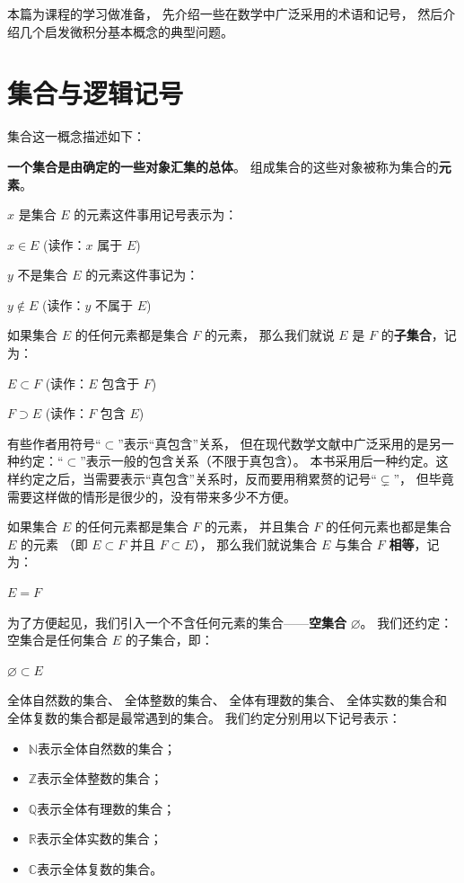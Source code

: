 \documentclass[12pt,a4paper,oneside,utf8]{ctexbook}
\begin{document}
\else%
\fi

本篇为课程的学习做准备，
先介绍一些在数学中广泛采用的术语和记号，
然后介绍几个启发微积分基本概念的典型问题。

\section{集合与逻辑记号}

集合这一概念描述如下：

\textbf{一个集合是由确定的一些对象汇集的总体}。
组成集合的这些对象被称为集合的\textbf{元素}。

$x$ 是集合 $E$ 的元素这件事用记号表示为：
\begin{center}
$x \in E$ \quad (读作：$x$ 属于 $E$)
\end{center}

$y$ 不是集合 $E$ 的元素这件事记为：
\begin{center}
$y \notin E$ \quad (读作：$y$ 不属于 $E$)
\end{center}

如果集合 $E$ 的任何元素都是集合 $F$ 的元素，
那么我们就说 $E$ 是 $F$ 的\textbf{子集合}，记为：
\begin{center}
$E \subset F$ \quad (读作：$E$ 包含于 $F$) 
\end{center}
\begin{center}
$F \supset E$ \quad (读作：$F$ 包含 $E$)
\end{center}

有些作者用符号“$\subset$”表示“真包含”关系，
但在现代数学文献中广泛采用的是另一种约定：“$\subset$”表示一般的包含关系（不限于真包含）。
本书采用后一种约定。这样约定之后，当需要表示“真包含”关系时，反而要用稍累赘的记号“$\subsetneq$”，
但毕竟需要这样做的情形是很少的，没有带来多少不方便。

如果集合 $E$ 的任何元素都是集合 $F$ 的元素，
并且集合 $F$ 的任何元素也都是集合 $E$ 的元素
（即 $E \subset F$ 并且 $F \subset E$），
那么我们就说集合 $E$ 与集合 $F$ \textbf{相等}，记为：
\begin{center}
$E = F$
\end{center}

为了方便起见，我们引入一个不含任何元素的集合——\textbf{空集合} $\varnothing$。
我们还约定：空集合是任何集合 $E$ 的子集合，即：
\begin{center}
$\varnothing \subset E$
\end{center}

全体自然数的集合、
全体整数的集合、
全体有理数的集合、
全体实数的集合和
全体复数的集合都是最常遇到的集合。
我们约定分别用以下记号表示：
\begin{itemize}
    \item $\mathbb{N}$表示全体自然数的集合；
    \item $\mathbb{Z}$表示全体整数的集合；
    \item $\mathbb{Q}$表示全体有理数的集合；
    \item $\mathbb{R}$表示全体实数的集合；
    \item $\mathbb{C}$表示全体复数的集合。
\end{itemize}
\end{document}
